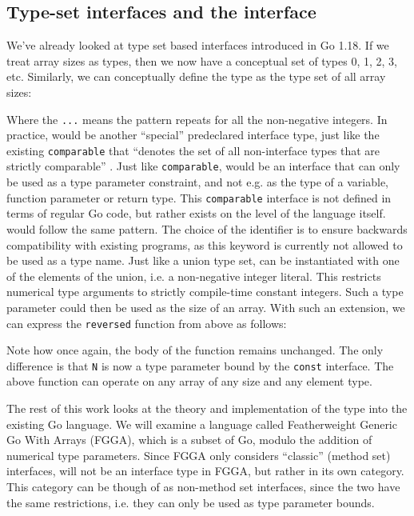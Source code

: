 \subsection{Type-set interfaces and the  interface}

We've already looked at type set based interfaces introduced in Go 1.18. If we
treat array sizes as types, then we now have a conceptual set of types 0, 1, 2,
3, etc. Similarly, we can conceptually define the  type as the type
set of all array sizes:


Where the \texttt{...} means the pattern repeats for all the non-negative
integers. In practice,  would be another ``special'' predeclared
interface type, just like the existing \texttt{comparable} that ``denotes the
set of all non-interface types that are strictly comparable'' \autocite{spec}.
Just like \texttt{comparable},  would be an interface that can only be
used as a type parameter constraint, and not e.g. as the type of a variable,
function parameter or return type.
This \texttt{comparable} interface is not defined in terms of regular Go code,
but rather exists on the level of the language itself.  would follow
the same pattern. The choice of the identifier  is to ensure backwards
compatibility with existing programs, as this keyword is currently not allowed
to be used as a type name. Just like a union type set,  can be
instantiated with one of the elements of the union, i.e. a non-negative integer
literal. This restricts numerical type arguments to strictly compile-time
constant integers. Such a type parameter could then be used as the size of an
array. With such an extension, we can express the \texttt{reversed} function from
above as follows:


Note how once again, the body of the function remains unchanged. The only
difference is that \texttt{N} is now a type parameter bound by the
\texttt{const} interface. The above function can operate on any array of any
size and any element type.

The rest of this work looks at the theory and implementation of the 
type into the existing Go language. We will examine a language called
Featherweight Generic Go With Arrays (FGGA), which is a subset of Go, modulo the
addition of numerical type parameters. Since FGGA only considers ``classic''
(method set) interfaces,  will not be an interface type in FGGA, but
rather in its own category. This category can be though of as non-method set
interfaces, since the two have the same restrictions, i.e. they can only be used
as type parameter bounds.

